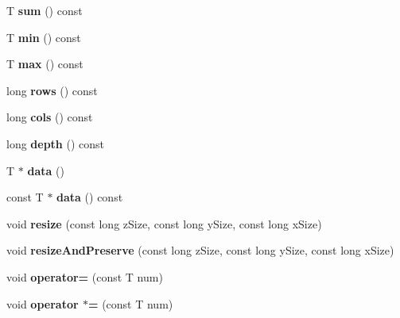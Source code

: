 \begin{DoxyCompactItemize}
T {\bfseries sum} () const
\item 
\mbox{\label{class_cryst_array3_d_a8cf5a294d01ba64b80807a4a408e2e3f}} 
T {\bfseries min} () const
\item 
\mbox{\label{class_cryst_array3_d_a4914e3ad0ccfb1eb71763be039eac931}} 
T {\bfseries max} () const
\item 
\mbox{\label{class_cryst_array3_d_a5ef3fa3e633908114f7df3c821d6a4eb}} 
long {\bfseries rows} () const
\item 
\mbox{\label{class_cryst_array3_d_a3bee8f2198baeb28ac111869eedf8c36}} 
long {\bfseries cols} () const
\item 
\mbox{\label{class_cryst_array3_d_a3033fcc21e0fa688792b515dc4a310fc}} 
long {\bfseries depth} () const
\item 
\mbox{\label{class_cryst_array3_d_ad232eb44450e7dd2f85aee4c442f2110}} 
T $\ast$ {\bfseries data} ()
\item 
\mbox{\label{class_cryst_array3_d_a7230ae62bf7450c80034301f6fbe8d0c}} 
const T $\ast$ {\bfseries data} () const
\item 
\mbox{\label{class_cryst_array3_d_a5d2f2a6cb1815b7ccc26d7baa89f162f}} 
void {\bfseries resize} (const long z\+Size, const long y\+Size, const long x\+Size)
\item 
\mbox{\label{class_cryst_array3_d_aaaf6b3b51d14fb97f294f522ad88d129}} 
void {\bfseries resize\+And\+Preserve} (const long z\+Size, const long y\+Size, const long x\+Size)
\item 
\mbox{\label{class_cryst_array3_d_a180dbc373520a3050f28c6d15f9d3127}} 
void {\bfseries operator=} (const T num)
\item 
\mbox{\label{class_cryst_array3_d_a220244e15d821b43ad50272fc6bf9d9b}} 
void {\bfseries operator $\ast$=} (const T num)
\item 

\end{DoxyCompactItemize}
